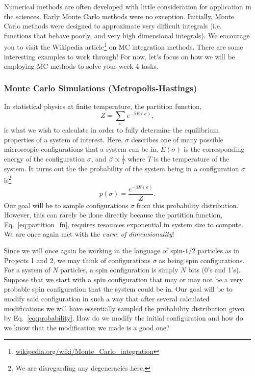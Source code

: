 \documentclass[12pt]{article}
\begin{document}
Numerical methods are often developed with little consideration for application in the sciences. Early Monte Carlo methods were no exception. Initially, Monte Carlo methods were designed to approximate very difficult integrals (i.e. functions that behave poorly, and very high dimensional integrals). We encourage you to visit the Wikipedia article\footnote{\href{http://en.wikipedia.org/wiki/Monte\_Carlo\_integration}{wikipedia.org/wiki/Monte\_Carlo\_integration}} on MC integration methods. There are some interesting examples to work through! For now, let's focus on how we will be employing MC methods to solve your week 4 tasks. 

\subsubsection{Monte Carlo Simulations (Metropolis-Hastings)}

In statistical physics at finite temperature, the partition function, 
\begin{equation} \label{eq:partition_fn}
    Z = \sum_{\sigma} e^{-\beta E(\sigma)},
\end{equation}
is what we wish to calculate in order to fully determine the equilibrium properties of a system of interest. Here, $\sigma$ describes one of many possible microscopic configurations that a system can be in, $E(\sigma)$ is the corresponding energy of the configuration $\sigma$, and $\beta \propto \frac{1}{T}$ where $T$ is the temperature of the system. It turns out the the probability of the system being in a configuration $\sigma$ is\footnote{We are disregarding any degeneracies here.}
\begin{equation} \label{eq:probability}
    p(\sigma) = \frac{e^{-\beta E(\sigma)}}{Z}.
\end{equation}
Our goal will be to sample configurations $\sigma$ from this probability distribution. However, this can rarely be done directly because the partition function, Eq.~\eqref{eq:partition_fn}, requires resources exponential in system size to compute. We are once again met with the {\it curse of dimensionality}!

Since we will once again be working in the language of spin-$1/2$ particles as in Projects 1 and 2, we may think of configurations $\sigma$ as being spin configurations. For a system of $N$ particles, a spin configuration is simply $N$ bits (0's and 1's). Suppose that we start with a spin configuration that may or may not be a very probable spin configuration that the system could be in. Our goal will be to modify said configuration in such a way that after several calculated modifications we will have essentially sampled the probability distribution given by Eq.~\eqref{eq:probability}. How do we modify the initial configuration and how do we know that the modification we made is a good one?
\end{document}
